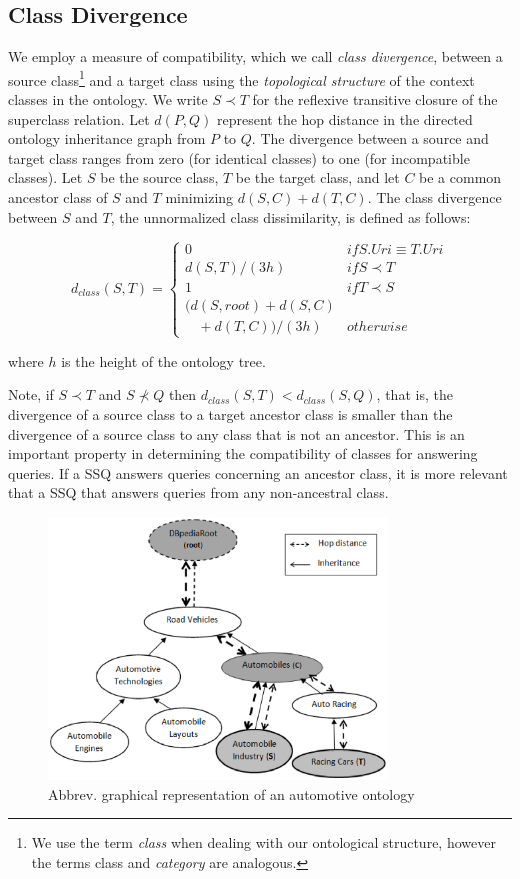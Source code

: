 \subsection{Class Divergence}
\label{sec:ctd}
We employ a measure of compatibility, which we call \textit{class
  divergence}, between a source class\footnote{We use the term \textit{class} when dealing with our ontological structure, however the terms class and \textit{category} are analogous.} and a target class using the \textit{topological structure} of the context classes in the
ontology. We write $S \prec T$ for the reflexive transitive closure of
the superclass relation. Let $d(P,Q)$ represent the hop distance in
the directed ontology inheritance graph from $P$ to $Q$. The
divergence between a source and target class ranges from zero (for
identical classes) to one (for incompatible classes).  Let $S$ be the
source class, $T$ be the target class, and let $C$ be a common
ancestor class of $S$ and $T$ minimizing $d(S,C) + d(T,C)$. The class
divergence between $S$ and $T$, the unnormalized class dissimilarity,
is defined as follows:

\begin{equation}
d_{class}(S, T) = \begin{cases}
0 & if S.{Uri} \equiv T.{Uri}\\
d(S, T)/(3h) & if S \prec T\\
1 & if T \prec S\\
(d(S,root) + d(S,C) \\ \ \ \ \ + d(T,C))/(3h) & otherwise
\end{cases}
\end{equation}

\noindent where $h$ is the height of the ontology tree.

Note, if $S \prec T$ and $S \not\prec Q$ then $d_{class}(S,T) <
d_{class}(S,Q)$, that is, the divergence of a source class to a target
ancestor class is smaller than the divergence of a source class to any
class that is not an ancestor. This is an important property in
determining the compatibility of classes for answering queries.  If a
SSQ answers queries concerning an ancestor class, it is more relevant
that a SSQ that answers queries from any non-ancestral class.

\begin{figure}[t]
\centering
\includegraphics[width=90mm]{class_divergence.eps}
\caption{Abbrev. graphical representation of an automotive ontology}
\label{fig:class_divergence}
\end{figure}

